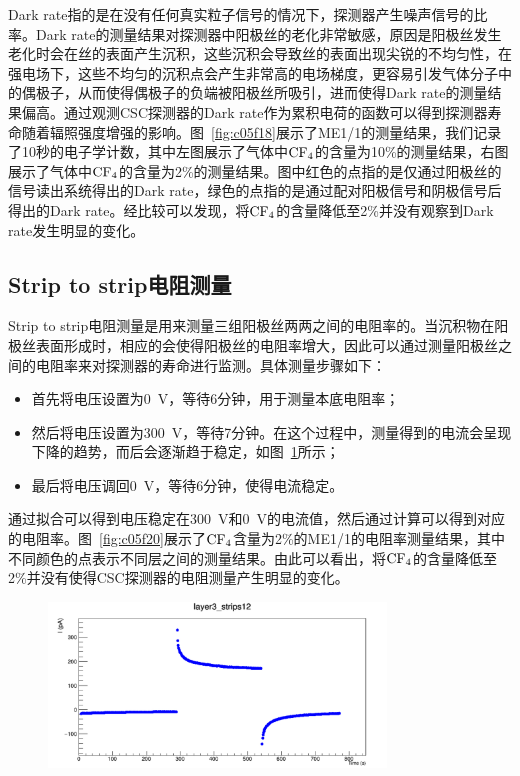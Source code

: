 Dark rate指的是在没有任何真实粒子信号的情况下，探测器产生噪声信号的比率。Dark rate的测量结果对探测器中阳极丝的老化非常敏感，原因是阳极丝发生老化时会在丝的表面产生沉积，这些沉积会导致丝的表面出现尖锐的不均匀性，在强电场下，这些不均匀的沉积点会产生非常高的电场梯度，更容易引发气体分子中的偶极子，从而使得偶极子的负端被阳极丝所吸引，进而使得Dark rate的测量结果偏高。通过观测CSC探测器的Dark rate作为累积电荷的函数可以得到探测器寿命随着辐照强度增强的影响。图~\ref{fig:c05f18}展示了ME1/1的测量结果，我们记录了10秒的电子学计数，其中左图展示了气体中$\mathrm{CF_4}$的含量为10\%的测量结果，右图展示了气体中$\mathrm{CF_4}$的含量为2\%的测量结果。图中红色的点指的是仅通过阳极丝的信号读出系统得出的Dark rate，绿色的点指的是通过配对阳极信号和阴极信号后得出的Dark rate。经比较可以发现，将$\mathrm{CF_4}$的含量降低至2\%并没有观察到Dark rate发生明显的变化。

\subsection{Strip to strip电阻测量}\label{sec:s2s}

Strip to strip电阻测量是用来测量三组阳极丝两两之间的电阻率的。当沉积物在阳极丝表面形成时，相应的会使得阳极丝的电阻率增大，因此可以通过测量阳极丝之间的电阻率来对探测器的寿命进行监测。具体测量步骤如下：
\begin{itemize}
    \item 首先将电压设置为0~\si{\V}，等待6分钟，用于测量本底电阻率；
    \item 然后将电压设置为300~\si{\V}，等待7分钟。在这个过程中，测量得到的电流会呈现下降的趋势，而后会逐渐趋于稳定，如图~\ref{fig:c05f19}所示；
    \item 最后将电压调回0~\si{\V}，等待6分钟，使得电流稳定。
\end{itemize}
通过拟合可以得到电压稳定在300~\si{\V}和0~\si{\V}的电流值，然后通过计算可以得到对应的电阻率。图~\ref{fig:c05f20}展示了$\mathrm{CF_4}$含量为2\%的ME1/1的电阻率测量结果，其中不同颜色的点表示不同层之间的测量结果。由此可以看出，将$\mathrm{CF_4}$的含量降低至2\%并没有使得CSC探测器的电阻测量产生明显的变化。

\begin{figure}[!htbp]
    \centering
    \includegraphics[width=0.8\textwidth]{figures/chapter05/s2s_shape.jpg}
    \label{fig:c05f19}
\end{figure}

